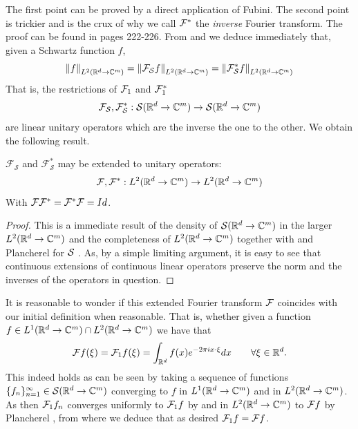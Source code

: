 \documentclass[
    a4paper,
    DIV=14,
    abstract=true,
    numbers=noenddot
]{scrartcl}
\begin{document}
The first point can be proved by a direct application of Fubini. The second point is trickier and is the crux of why we call $\mathcal{F}^*$ the \emph{inverse} Fourier transform. The proof can be found in \cite{Tay} pages 222-226.
From  and  we deduce immediately that, given a Schwartz function $f$,
\begin{equation}\label{Plancherel}
	\left\lVert f \right\rVert_{L^2(\mathbb{R}^d\to\mathbb{C}^m)}=\left\lVert \mathcal{F}_\mathcal{S}f \right\rVert_{L^2(\mathbb{R}^d\to\mathbb{C}^m)}=\left\lVert \mathcal{F}_\mathcal{S}^*f \right\rVert_{L^2(\mathbb{R}^d\to\mathbb{C}^m)}
\end{equation}
That is, the restrictions of $\mathcal{F}_1$ and $\mathcal{F}^*_1$ \[\mathcal{F}_\mathcal{S},\mathcal{F}_\mathcal{S}^*:\mathcal{S}(\mathbb{R}^d\to\mathbb{C}^m)\to\mathcal{S}(\mathbb{R}^d\to\mathbb{C}^m)\]
are linear unitary operators which are the inverse the one to the other. We obtain the following result.\bigbreak
\begin{proposition}\label{Plancherel's Theorem}\bigbreak $\mathcal{F}_\mathcal{S}$ and $\mathcal{F}_\mathcal{S}^*$ may be extended to unitary operators:
\[\mathcal{F},\mathcal{F}^*:L^2(\mathbb{R}^d\to\mathbb{C}^m)\to L^2(\mathbb{R}^d\to\mathbb{C}^m)\]
With $\mathcal{F}\mathcal{F}^*=\mathcal{F}^*\mathcal{F}=Id$.
\end {proposition}
\begin{proof}
	This is a immediate result of the density of $\mathcal{S}(\mathbb{R}^d\to\mathbb{C}^m)$ in the larger $L^2(\mathbb{R}^d\to\mathbb{C}^m)$ and the completeness of $L^2(\mathbb{R}^d\to\mathbb{C}^m)$ together with  and Plancherel for $\mathcal{S}$ . As, by a simple limiting argument, it is easy to see that continuous extensions of continuous linear operators preserve the norm and the inverses of the operators in question.
\end{proof}
It is reasonable to wonder if this extended Fourier transform $\mathcal{F}$ coincides with our initial definition when reasonable.
That is, whether given a function $f \in L^1(\mathbb{R}^d\to\mathbb{C}^m)\cap L^2(\mathbb{R}^d\to\mathbb{C}^m)$ we have that
\[\mathcal{F} f(\xi)=\mathcal{F}_1f(\xi)=\int_{\mathbb{R}^d}f(x)e^{-2\pi ix\cdot \xi} dx\qquad\forall \xi\in\mathbb{R}^d.\]
This indeed holds as can be seen by taking a sequence of functions $\lbrace f_n\rbrace_{n=1}^\infty\in\mathcal{S}(\mathbb{R}^d\to\mathbb{C}^m)$ converging to $f$ in  $L^1(\mathbb{R}^d\to\mathbb{C}^m)$ and in $L^2(\mathbb{R}^d\to\mathbb{C}^m)$.
As then $\mathcal{F}_1 f_n$ converges uniformly to $\mathcal{F}_1f$ by  and in $L^2(\mathbb{R}^d\to\mathbb{C}^m)$ to $\mathcal{F} f$ by Plancherel , from where we deduce that as desired $\mathcal{F}_1f=\mathcal{F} f$. \bigbreak
\end{document}
